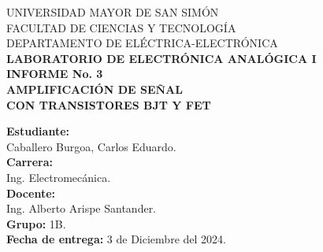 \documentclass[letter,twoside,11pt]{report}
\newcommand{\blankpage}{
\newpage
\thispagestyle{empty}
\mbox{}
\newpage
}
\begin{document}
\begin{titlepage}
    \begin{center}
        {\Large UNIVERSIDAD MAYOR DE SAN SIMÓN}\\
        \vspace*{0.15cm}
        {\large FACULTAD DE CIENCIAS Y TECNOLOGÍA}\\
        \vspace*{0.10cm}
        DEPARTAMENTO DE ELÉCTRICA-ELECTRÓNICA\\
        \vspace*{3.0cm}
        {\Large \textbf{LABORATORIO DE ELECTRÓNICA ANALÓGICA I}}\\
        \vspace*{0.3cm}
        {\Large \textbf{INFORME No. 3}}\\
        \vspace*{3.5cm}
        {\Large \textbf{AMPLIFICACIÓN DE SEÑAL\\
        CON TRANSISTORES BJT Y FET}}\\
    \end{center}

    \vspace*{5.8cm}
    \leftskip=7.95cm
    \noindent
    \textbf{Estudiante:}\\
    Caballero Burgoa, Carlos Eduardo.\\
    \newline
    \textbf{Carrera:}\\
    Ing. Electromecánica.\\
    \newline
    \textbf{Docente:}\\
    Ing. Alberto Arispe Santander.\\
    \newline
    \textbf{Grupo:} 1B.\\
    \textbf{Fecha de entrega:} 3 de Diciembre del 2024.\\
\end{titlepage}
\addtocounter{page}{-1}

\blankpage
\addtocounter{page}{-1}

\tableofcontents
\newpage

%
%
%
%
%
%
%
%

%
\end{document}
